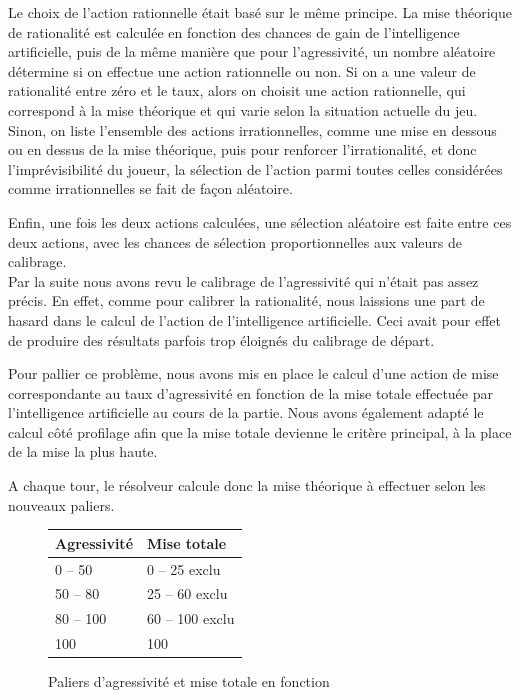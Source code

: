 \documentclass{report}
\begin{document}
Le choix de l'action rationnelle était basé sur le même principe. La mise théorique de rationalité est calculée en fonction des chances de gain de l'intelligence artificielle, puis de la même manière que pour l'agressivité, un nombre aléatoire détermine si on effectue une action rationnelle ou non. Si on a une valeur de rationalité entre zéro et le taux, alors on choisit une action rationnelle, qui correspond à la mise théorique et qui varie selon la situation actuelle du jeu. Sinon, on liste l'ensemble des actions irrationnelles, comme une mise en dessous ou en dessus de la mise théorique, puis pour renforcer l’irrationalité, et donc l'imprévisibilité du joueur, la sélection de l'action parmi toutes celles considérées comme irrationnelles se fait de façon aléatoire.\par

Enfin, une fois les deux actions calculées, une sélection aléatoire est faite entre ces deux actions, avec les chances de sélection proportionnelles aux valeurs de calibrage.\\

\hspace{0.5cm}Par la suite nous avons revu le calibrage de l'agressivité qui n'était pas assez précis. En effet, comme pour calibrer la rationalité, nous laissions une part de hasard dans le calcul de l'action de l'intelligence artificielle. Ceci avait pour effet de produire des résultats parfois trop éloignés du calibrage de départ.\par
Pour pallier ce problème, nous avons mis en place le calcul d'une action de mise correspondante au taux d'agressivité en fonction de la mise totale effectuée par l'intelligence artificielle au cours de la partie. Nous avons également adapté le calcul côté profilage afin que la mise totale devienne le critère principal, à la place de la mise la plus haute.\par
A chaque tour, le résolveur calcule donc la mise théorique à effectuer selon les nouveaux paliers.\par


\begin{figure}[H]
\begin{center}
\begin{tabular}{|l|l|}
	\hline
   Agressivité & Mise totale \\
   \hline
   0 – 50 & 0 – 25	exclu \\
   \hline
   50 – 80 & 25 – 60 exclu\\
   \hline
   80 – 100 & 60 – 100 exclu\\
   \hline
   100 & 100\\
   \hline
\end{tabular}	
\end{center}
\caption{Paliers d'agressivité et mise totale en fonction}
\end{figure}
\end{document}
